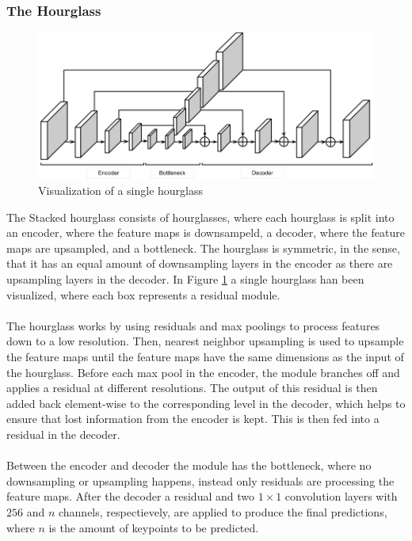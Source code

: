 \documentclass[./main.tex]{subfiles}
\begin{document}
\subsubsection{The Hourglass}
\begin{figure}[htbp]
    \centering
    \includegraphics[width = 12 cm]{entities/Hourglass.png}
    \caption{Visualization of a single hourglass \cite{Newell}}
    \label{fig:hourglass}
\end{figure}
\noindent The Stacked hourglass consists of hourglasses, where each hourglass is split into an encoder, where the feature maps is downsampeld, a decoder, where the feature maps are upsampled, and a bottleneck. The hourglass is symmetric, in the sense, that it has an equal amount of downsampling layers in the encoder as there are upsampling layers in the decoder. In Figure \ref{fig:hourglass} a single hourglass han been visualized, where each box represents a residual module.
\\
\\
The hourglass works by using residuals and max poolings to process features down to a low resolution. Then, nearest neighbor upsampling is used to upsample the feature maps until the feature maps have the same dimensions as the input of the hourglass. Before each max pool in the encoder, the module branches off and applies a residual at different resolutions. The output of this residual is then added back element-wise to the corresponding level in the decoder, which helps to ensure that lost information from the encoder is kept. This is then fed into a residual in the decoder.
\\
\\
Between the encoder and decoder the module has the bottleneck, where no downsampling or upsampling happens, instead only residuals are processing the feature maps. After the decoder a residual and two $1 \times 1$ convolution layers with $256$ and $n$ channels, respectievely, are applied to produce the final predictions, where $n$ is the amount of keypoints to be predicted.
\end{document}
